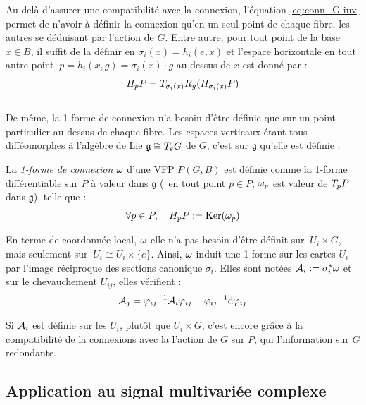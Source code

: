 Au delà d'assurer une compatibilité avec la connexion, l'équation \eqref{eq:conn_G-inv} permet de n'avoir à définir la connexion qu'en un seul point de chaque fibre, les autres se déduisant par l'action de $G$. Entre autre, pour tout point de la base $x\in B$, il suffit de la définir en $\sigma_i(x) = h_i(e, x)$ et l'espace horizontale en tout autre point $\ p=h_i(x,g) = \sigma_i(x)\cdot g$ au dessus de $x$ est donné par :
\[\hg[p]{P} = \tg[\sigma_i(x)]{R_g} (\hg[\sigma_i(x)]{P})\]
\\
De même, la 1-forme de connexion n'a besoin d'être définie que sur un point particulier au dessus de chaque fibre. Les espaces verticaux étant tous difféomorphes à l'algèbre de Lie $\mathfrak{g}\cong \tg[e]{G}$ de $G$, c'est sur $\mathfrak{g}$ qu'elle est définie :

\begin{definition}
	La \emph{1-forme de connexion} $\conn$ d'une VFP $P(G,B)$ est définie comme la 1-forme différentiable sur $P$ à valeur dans $\mathfrak{g}$ (\ie~en tout point $p\in P$, $\conn_p$ est valeur de $\tg[p]{P}$ dans $\mathfrak{g}$), telle que :
	\begin{equation} \label{eq:1-form2conn}
		\forall p\in P,\quad \hg[p]{P} \defeq \Ker(\conn_p)
	\end{equation}
	\skipl
	
	En terme de coordonnée local, $\conn$ elle n'a pas besoin d'être définit sur $\ U_i\times G$, mais seulement sur $\ U_i \cong U_i \times \{e\}$. Ainsi, $\conn$ induit une 1-forme sur les cartes $U_i$ par l'image réciproque des sections canonique $\sigma_i$. Elles sont notées $\locconn_i \defeq \sigma_i^*\conn$ et sur le chevauchement $U_{ij}$, elles vérifient :
	\begin{equation}\label{eq:conn_local}
		\locconn_j = {\varphi_{ij}}^{-1} \locconn_i \varphi_{ij} + {\varphi_{ij}}^{-1} \d \varphi_{ij}
	\end{equation}
\end{definition}
\skipl

Si $\locconn_i$ est définie sur les $U_i$, plutôt que $U_i\times G$, c'est encore  grâce à la compatibilité de la connexions avec la l'action de $G$ sur $P$, qui l'information sur $G$ redondante. . 
\\



\subsection{Application au signal multivariée complexe}\label{subsec:PC^n}

